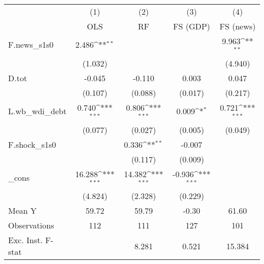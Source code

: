 {
\def\sym#1{\ifmmode^{#1}\else\(^{#1}\)\fi}
\begin{tabular}{l*{4}{c}}
\toprule
            &\multicolumn{1}{c}{(1)}&\multicolumn{1}{c}{(2)}&\multicolumn{1}{c}{(3)}&\multicolumn{1}{c}{(4)}\\
            &\multicolumn{1}{c}{OLS}&\multicolumn{1}{c}{RF}&\multicolumn{1}{c}{FS (GDP)}&\multicolumn{1}{c}{FS (news)}\\
\midrule
F.news\_s1s0 &       2.486\sym{**} &                     &                     &       9.963\sym{**} \\
            &     (1.032)         &                     &                     &     (4.940)         \\
\addlinespace
D.tot       &      -0.045         &      -0.110         &       0.003         &       0.047         \\
            &     (0.107)         &     (0.088)         &     (0.017)         &     (0.217)         \\
\addlinespace
L.wb\_wdi\_debt&       0.740\sym{***}&       0.806\sym{***}&       0.009\sym{*}  &       0.721\sym{***}\\
            &     (0.077)         &     (0.027)         &     (0.005)         &     (0.049)         \\
\addlinespace
F.shock\_s1s0&                     &       0.336\sym{**} &      -0.007         &                     \\
            &                     &     (0.117)         &     (0.009)         &                     \\
\addlinespace
\_cons      &      16.288\sym{***}&      14.382\sym{***}&      -0.936\sym{***}&                     \\
            &     (4.824)         &     (2.328)         &     (0.229)         &                     \\
\midrule
Mean Y      &       59.72         &       59.79         &       -0.30         &       61.60         \\
Observations&         112         &         111         &         127         &         101         \\
Exc. Inst. F-stat&                     &       8.281         &       0.521         &      15.384         \\
\bottomrule
\end{tabular}
}
